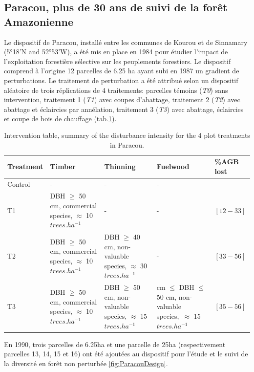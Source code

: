 \documentclass[
  11pt,
  french,
  A4paper,
  extrafontsizes,onecolumn,openright
  ]{memoir}
\begin{document}
\subsection{Paracou, plus de 30 ans de suivi de la forêt
Amazonienne}\label{paracou-plus-de-30-ans-de-suivi-de-la-foret-amazonienne}

Le dispositif de Paracou, installé entre les communes de Kourou et de
Sinnamary (5°18'N and 52°53'W), a été mis en place en 1984 pour étudier
l'impact de l'exploitation forestière sélective sur les peuplements
forestiers. Le dispositif comprend à l'origine 12 parcelles de 6.25 ha
ayant subi en 1987 un gradient de perturbations. Le traitement de
perturbation a été attribué selon un dispositif aléatoire de trois
réplications de 4 traitements: parcelles témoins (\emph{T0}) sans
intervention, traitement 1 (\emph{T1}) avec coupes d'abattage,
traitement 2 (\emph{T2}) avec abattage et éclaircies par annélation,
traitement 3 (\emph{T3}) avec abattage, éclaircies et coupe de bois de
chauffage (tab.\ref{tab:InterventionTable}).

\begingroup\fontsize{7}{9}\selectfont

\begin{longtable}[t]{>{\raggedright\arraybackslash}p{5em}|>{\raggedright\arraybackslash}p{8em}|>{\raggedright\arraybackslash}p{8em}|>{\raggedright\arraybackslash}p{11em}|>{\raggedright\arraybackslash}p{4em}}
\caption{\label{tab:InterventionTable}Intervention table, summary of the disturbance intensity for the 4 plot treatments in Paracou.}\\
\hline
Treatment & Timber & Thinning & Fuelwood & \%AGB lost\\
\hline
Control & - & - & - & 0\\
\hline
T1 & DBH $\geq$ 50 cm, commercial species, $\approx$ 10   $trees.ha^{-1}$ & - & - & $[12-33]$\\
\hline
T2 & DBH $\geq$ 50 cm, commercial species, $\approx$ 10  $trees.ha^{-1}$ & DBH $\geq$ 40 cm, non-valuable species, $\approx$ 30   $trees.ha^{-1}$ & - & $[33-56]$\\
\hline
T3 & DBH $\geq$ 50 cm, commercial species, $\approx$ 10  $trees.ha^{-1}$ & DBH $\geq$ 50 cm, non-valuable species, $\approx$ 15  $trees.ha^{-1}$ & 40 cm $\leq$ DBH $\leq$ 50 cm, non-valuable species,\ $\approx$ 15 $trees.ha^{-1}$ & $[35-56]$\\
\hline
\end{longtable}

\endgroup{}

En 1990, trois parcelles de 6.25ha et une parcelle de 25ha
(respectivement parcelles 13, 14, 15 et 16) ont été ajoutées au
dispositif pour l'étude et le suivi de la diversité en forêt non
perturbée \ref{fig:ParacouDesign}.
\end{document}
